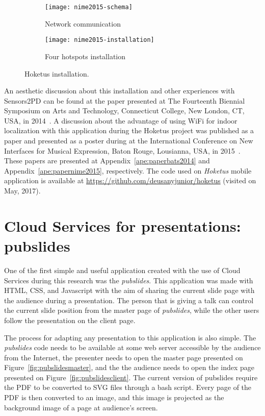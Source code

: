 \begin{figure*}[!ht]
	\centering
	\begin{subfigure}{.45\textwidth}
		\texttt{[image: nime2015-schema]}
		\caption{Network communication}
		\label{fig:installation-schema}
	\end{subfigure}
	\begin{subfigure}{.45\textwidth}
		\texttt{[image: nime2015-installation]}
		\caption{Four hotspots installation}
		\label{fig:installation}
	\end{subfigure}
	
	\caption{Hoketus installation.}
	\label{fig:hoketusinstallation}
\end{figure*}

An aesthetic discussion about this installation and other experiences with Sensors2PD can be found at the paper presented at The Fourteenth Biennial Symposium on Arts and Technology, Connecticut College, New London, CT, USA, in 2014~\citep{Bandeira2014notes}.
A discussion about the advantage of using WiFi for indoor localization with this application during the Hoketus project was published as a paper and presented as a poster during at the International Conference on New Interfaces for Musical Expression, Baton Rouge, Lousianna, USA, in 2015~\citep{deCarvalhoJunior2015indoor}.
These papers are presented at Appendix~\ref{ape:paperbats2014} and Appendix~\ref{ape:papernime2015}, respectively.
The code used on \textit{Hoketus} mobile application is available at \url{https://github.com/deusanyjunior/hoketus} (visited on May, 2017).

\section{Cloud Services for presentations: pubslides}
\label{apesec:apppubslides}

One of the first simple and useful application created with the use of Cloud Services during this research was the \textit{pubslides}.
This application was made with HTML, CSS, and Javascript with the aim of sharing the current slide page with the audience during a presentation.
The person that is giving a talk can control the current slide position from the master page of \textit{pubslides}, while the other users follow the presentation on the client page.

The process for adapting any presentation to this application is also simple.
The \textit{pubslides} code needs to be available at some web server accessible by the audience from the Internet, the presenter needs to open the master page presented on Figure~\ref{fig:pubslidesmaster}, and the the audience needs to open the index page presented on Figure~\ref{fig:pubslidesclient}.
The current version of pubslides require the PDF to be converted to SVG files through a bash script.
Every page of the PDF is then converted to an image, and this image is projected as the background image of a page at audience's screen.

